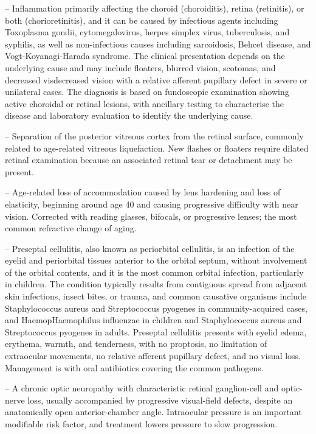-- Inflammation primarily affecting the choroid (choroiditis), retina (retinitis), or both (chorioretinitis), and it can be caused by infectious agents including Toxoplasma gondii, cytomegalovirus, herpes simplex virus, tuberculosis, and syphilis, as well as non-infectious causes including sarcoidosis, Behcet disease, and Vogt-Koyanagi-Harada syndrome. The clinical presentation depends on the underlying cause and may include floaters, blurred vision, scotomas, and decreased visdecreased vision with a relative afferent pupillary defect in severe or unilateral cases. The diagnosis is based on fundoscopic examination showing active choroidal or retinal lesions, with ancillary testing to characterise the disease and laboratory evaluation to identify the underlying cause.

-- Separation of the posterior vitreous cortex from the retinal surface, commonly related to age-related vitreous liquefaction. New flashes or floaters require dilated retinal examination because an associated retinal tear or detachment may be present.

-- Age-related loss of accommodation caused by lens hardening and loss of elasticity, beginning around age 40 and causing progressive difficulty with near vision. Corrected with reading glasses, bifocals, or progressive lenses; the most common refractive change of aging.

-- Preseptal cellulitis, also known as periorbital cellulitis, is an infection of the eyelid and periorbital tissues anterior to the orbital septum, without involvement of the orbital contents, and it is the most common orbital infection, particularly in children. The condition typically results from contiguous spread from adjacent skin infections, insect bites, or trauma, and common causative organisms include Staphylococcus aureus and Streptococcus pyogenes in community-acquired cases, and HaemopHaemophilus influenzae in children and Staphylococcus aureus and Streptococcus pyogenes in adults. Preseptal cellulitis presents with eyelid edema, erythema, warmth, and tenderness, with no proptosis, no limitation of extraocular movements, no relative afferent pupillary defect, and no visual loss. Management is with oral antibiotics covering the common pathogens.

-- A chronic optic neuropathy with characteristic retinal ganglion-cell and optic-nerve loss, usually accompanied by progressive visual-field defects, despite an anatomically open anterior-chamber angle. Intraocular pressure is an important modifiable risk factor, and treatment lowers pressure to slow progression.

